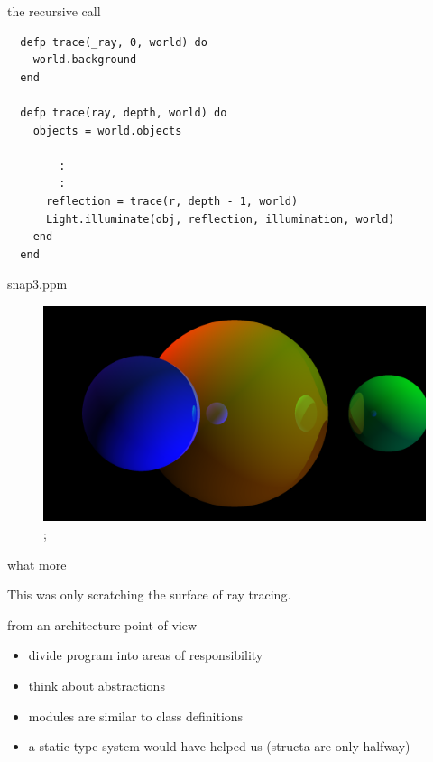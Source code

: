 \begin{frame}[fragile]{the recursive call}

\pause 
\begin{verbatim}
  defp trace(_ray, 0, world) do
    world.background
  end

  defp trace(ray, depth, world) do
    objects = world.objects

        :
        :
      reflection = trace(r, depth - 1, world)
      Light.illuminate(obj, reflection, illumination, world)
    end
  end

\end{verbatim}

\end{frame}

\begin{frame}{snap3.ppm}

\begin{figure}
\includegraphics[scale=0.2]{snap3.png};
\end{figure}

\end{frame}


\begin{frame}{what more}

This was only scratching the surface of ray tracing.

\end{frame}

\begin{frame}{from an architecture point of view}

\begin{itemize}
 \pause \item divide program into areas of responsibility
 \pause \item think about abstractions
 \pause \item modules are similar to class definitions
 \pause \item a static type system would have helped us (structa are only halfway)
\end{itemize}

\end{frame}


